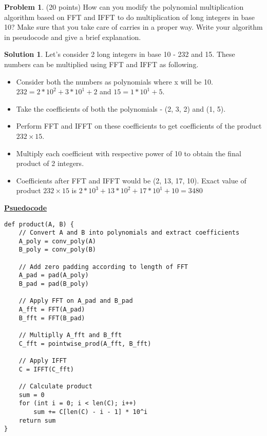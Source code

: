 \documentclass{article}
\theoremstyle{definition}
\newtheorem{problem}{Problem}
\newtheorem*{solution}{Solution}
\begin{document}
\begin{problem} (20 points) 
How can you modify the polynomial multiplication algorithm based
  on FFT and IFFT to do multiplication of long integers in base 10?
  Make sure that you take care of carries in a proper way. Write your
  algorithm in pseudocode and give a brief explanation. 
\end{problem}
\begin{solution}
Let's consider 2 long integers in base 10 - 232 and 15. These numbers can be multiplied using FFT and IFFT as following.
\begin{itemize}
    \item Consider both the numbers as polynomials where x will be 10. $232 = 2*10^2 + 3*10^1 + 2$ and $15 = 1*10^1 + 5$.
    \item Take the coefficients of both the polynomials - (2, 3, 2) and (1, 5).
    \item Perform FFT and IFFT on these coefficients to get coefficients of the product $232 \times 15$.
    \item Multiply each coefficient with respective power of 10 to obtain the final product of 2 integers.
    \item Coefficients after FFT and IFFT would be (2, 13, 17, 10). Exact value of product $232\times 15$ is $2*10^3 + 13*10^2 + 17*10^1 + 10 = 3480$
\end{itemize}
\textbf{\underline{Psuedocode}}
\begin{verbatim}
def product(A, B) {
    // Convert A and B into polynomials and extract coefficients
    A_poly = conv_poly(A)
    B_poly = conv_poly(B)

    // Add zero padding according to length of FFT
    A_pad = pad(A_poly)
    B_pad = pad(B_poly)

    // Apply FFT on A_pad and B_pad
    A_fft = FFT(A_pad)
    B_fft = FFT(B_pad)

    // Multiplly A_fft and B_fft
    C_fft = pointwise_prod(A_fft, B_fft)

    // Apply IFFT
    C = IFFT(C_fft)

    // Calculate product
    sum = 0
    for (int i = 0; i < len(C); i++)
        sum += C[len(C) - i - 1] * 10^i
    return sum
}
\end{verbatim}
\end{solution}
\newpage
\end{document}
